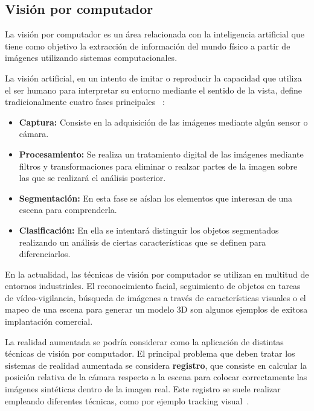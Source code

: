 \subsection{Visión por computador}

La visión por computador es un área relacionada con la  inteligencia artificial que tiene como objetivo la extracción de información del mundo físico a partir de imágenes utilizando sistemas computacionales. 

La visión artificial, en un intento de imitar o reproducir la capacidad que utiliza el ser humano para interpretar su entorno mediante el sentido de la vista, define tradicionalmente cuatro fases principales ~\cite{velez}: 

\begin{itemize}

\item \textbf{Captura:} Consiste en la adquisición de las imágenes mediante algún sensor o cámara. 

\item \textbf{Procesamiento:} Se realiza un tratamiento digital de las imágenes mediante filtros y transformaciones para eliminar o realzar partes de la imagen sobre las que se realizará el análisis posterior. 

\item \textbf{Segmentación:} En esta fase se aíslan los elementos que interesan de una escena para comprenderla. 

\item \textbf{Clasificación:} En ella se intentará distinguir los objetos segmentados realizando un análisis de ciertas características que se definen para diferenciarlos.

\end{itemize}

En la actualidad, las técnicas de visión por computador se utilizan en multitud de entornos industriales. El reconocimiento facial, seguimiento de objetos en tareas de vídeo-vigilancia, búsqueda de imágenes a través de características visuales o el mapeo de una escena para generar un modelo 3D son algunos ejemplos de exitosa implantación comercial.

La realidad aumentada se podría considerar como la aplicación de distintas técnicas de visión por computador. El principal problema que deben tratar los sistemas de realidad aumentada se considera \textbf{registro}, que consiste en calcular la posición relativa de la cámara respecto a la escena para colocar correctamente las imágenes sintéticas dentro de la  imagen real. Este registro se suele realizar empleando diferentes técnicas, como por ejemplo tracking visual~\cite{gonzalez}.

